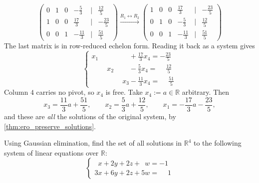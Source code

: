 \begin{example}
\[\begin{pmatrix}
0 & 1 & 0 & -\frac{5}{3} & \big| & \frac{12}{5} \\
1 & 0 & 0 & \frac{17}{3} & \big| & -\frac{23}{5} \\
0 & 0 & 1 & -\frac{11}{3} & \big| & \frac{51}{5}
\end{pmatrix}
\xrightarrow{R_1 \leftrightarrow R_2}
\begin{pmatrix}
1 & 0 & 0 & \frac{17}{3} & \big| & -\frac{23}{5} \\
0 & 1 & 0 & -\frac{5}{3} & \big| & \frac{12}{5} \\
0 & 0 & 1 & -\frac{11}{3} & \big| & \frac{51}{5}
\end{pmatrix}
\]
The last matrix is in row-reduced echelon form. Reading it back as a system gives
\[
\begin{cases}
x_1 \phantom{{}+ x_2 + x_3} + \frac{17}{3}x_4 = -\frac{23}{5} \\
\phantom{x_1 + {}} x_2 \phantom{{}+ x_3} - \frac{5}{3}x_4 = \phantom{-}\frac{12}{5} \\
\phantom{x_1 + x_2 + {}} x_3 - \frac{11}{3}x_4 = \phantom{-}\frac{51}{5}
\end{cases}
\]
Column $4$ carries no pivot, so $x_4$ is free. Take $x_4 := a \in \mathbb{R}$ arbitrary. Then
\[
x_3 = \frac{11}{3}a + \frac{51}{5}, \qquad
x_2 = \frac{5}{3}a + \frac{12}{5}, \qquad
x_1 = -\frac{17}{3}a - \frac{23}{5},
\]
and these are \emph{all} the solutions of the original system, by \cref{thm:ero_preserve_solutions}.
\end{example}

\begin{exercise}
\label{exc:gauss_elimination_4vars}
Using Gaussian elimination, find the set of all solutions in $\mathbb{R}^4$ to the following system of linear equations over $\mathbb{R}$:
\[
\begin{cases}
\phantom{3}x + 2y + 2z + \phantom{5}w = -1 \\
3x + 6y + 2z + 5w = \phantom{-}1
\end{cases}
\]
\end{exercise}


